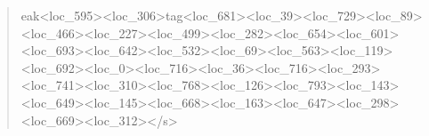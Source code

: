 \documentclass[10pt,a4paper]{article}
\begin{document}
\begin{quote}
eak{}<lo\allowbreak{}c\_595>\allowbreak{}<loc\_306>\allowbreak{}tag<loc\_681>\allowbreak{}<loc\_\allowbreak{}39>\allowbreak{}<loc\_729>\allowbreak{}<loc\_89>\allowbreak{}<loc\_466>\allowbreak{}<lo\allowbreak{}c\_227>\allowbreak{}<loc\_499>\allowbreak{}<loc\_282>\allowbreak{}<loc\_654\allowbreak{}>\allowbreak{}<loc\_601>\allowbreak{}<loc\_693>\allowbreak{}<loc\_642>\allowbreak{}<loc\allowbreak{}\_532>\allowbreak{}<loc\_69>\allowbreak{}<loc\_563>\allowbreak{}<loc\_119>\allowbreak{}<\allowbreak{}loc\_692>\allowbreak{}<loc\_0>\allowbreak{}<loc\_716>\allowbreak{}<loc\_36>\allowbreak{}\allowbreak{}<loc\_716>\allowbreak{}<loc\_293>\allowbreak{}<loc\_741>\allowbreak{}<loc\_\allowbreak{}310>\allowbreak{}<loc\_768>\allowbreak{}<loc\_126>\allowbreak{}<loc\_793>\allowbreak{}<\allowbreak{}loc\_143>\allowbreak{}<loc\_649>\allowbreak{}<loc\_145>\allowbreak{}<loc\_6\allowbreak{}68>\allowbreak{}<loc\_163>\allowbreak{}<loc\_647>\allowbreak{}<loc\_298>\allowbreak{}<l\allowbreak{}oc\_669>\allowbreak{}<loc\_312>\allowbreak{}</s>\allowbreak{}
\end{quote}
\end{document}
